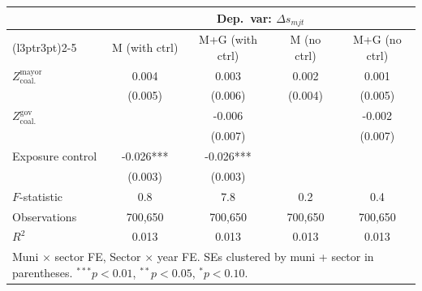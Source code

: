 \begin{tabular}[t]{lcccc}
\toprule
\multicolumn{1}{c}{\textbf{ }} & \multicolumn{4}{c}{\textbf{Dep.~var: $\Delta s_{mjt}$}} \\
\cmidrule(l{3pt}r{3pt}){2-5}
  & M (with ctrl) & M+G (with ctrl) & M (no ctrl) & M+G (no ctrl)\\
\midrule
$Z^{\text{mayor}}_{\text{coal.}}$ & 0.004 & 0.003 & 0.002 & 0.001\\
 & (0.005) & (0.006) & (0.004) & (0.005)\\
$Z^{\text{gov}}_{\text{coal.}}$ &  & -0.006 &  & -0.002\\
 &  & (0.007) &  & (0.007)\\
Exposure control & -0.026*** & -0.026*** &  & \\
 & (0.003) & (0.003) &  & \\
\midrule
$F$-statistic & 0.8 & 7.8 & 0.2 & 0.4\\
Observations & 700,650 & 700,650 & 700,650 & 700,650\\
$R^2$ & 0.013 & 0.013 & 0.013 & 0.013\\
\bottomrule
\multicolumn{5}{l}{\rule{0pt}{1em}Muni $\times$ sector FE, Sector $\times$ year FE. SEs clustered by muni + sector in parentheses. $^{***}p<0.01$, $^{**}p<0.05$, $^{*}p<0.10$.}\\
\end{tabular}
